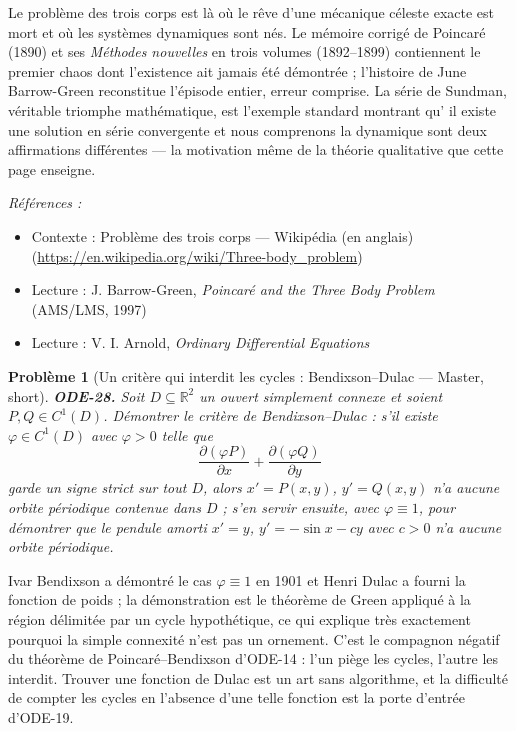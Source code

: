 \documentclass[11pt]{article}
\newtheorem{problem}{Problème}
\newenvironment{refs}{\par\small\noindent\emph{Références :}\begin{itemize}\setlength\itemsep{0pt}}{\end{itemize}\normalsize}
\begin{document}
\noindent Le problème des trois corps est là où le rêve d'une mécanique céleste exacte est
mort et où les systèmes dynamiques sont nés. Le mémoire corrigé de Poincaré (1890) et ses
\textit{Méthodes nouvelles} en trois volumes (1892--1899) contiennent le premier chaos dont
l'existence ait jamais été démontrée ; l'histoire de June Barrow-Green reconstitue l'épisode
entier, erreur comprise. La série de Sundman, véritable triomphe mathématique, est l'exemple
standard montrant qu'\og{} il existe une solution en série convergente \fg{} et \og{} nous comprenons la
dynamique \fg{} sont deux affirmations différentes --- la motivation même de la théorie qualitative que
cette page enseigne.

\begin{refs}
\item Contexte : Problème des trois corps --- Wikipédia (en anglais) (\url{https://en.wikipedia.org/wiki/Three-body_problem})
\item Lecture : J. Barrow-Green, \textit{Poincaré and the Three Body Problem} (AMS/LMS, 1997)
\item Lecture : V. I. Arnold, \textit{Ordinary Differential Equations}
\end{refs}

\bigskip

\begin{problem}[{Un critère qui interdit les cycles : Bendixson--Dulac --- Master, short}]
\textbf{ODE-28.} Soit $ D \subseteq \mathbb{R}^2 $ un ouvert simplement
connexe et soient $ P, Q \in C^1(D) $. Démontrer le critère de Bendixson--Dulac : s'il existe
$ \varphi \in C^1(D) $ avec $ \varphi >0 $ telle que
\[ \frac{\partial(\varphi P)}{\partial x} + \frac{\partial(\varphi Q)}{\partial y} \]
garde un signe strict sur tout $ D $, alors $ x' = P(x,y) $, $ y' = Q(x,y) $ n'a aucune
orbite périodique contenue dans $ D $ ; s'en servir ensuite, avec $ \varphi \equiv 1 $, pour
démontrer que le pendule amorti $ x' = y $, $ y' = -\sin x - cy $ avec $ c >0 $ n'a
aucune orbite périodique.
\end{problem}

\noindent Ivar Bendixson a démontré le cas $ \varphi \equiv 1 $ en 1901 et Henri Dulac
a fourni la fonction de poids ; la démonstration est le théorème de Green appliqué à la région
délimitée par un cycle hypothétique, ce qui explique très exactement pourquoi la simple connexité
n'est pas un ornement. C'est le compagnon négatif du théorème de Poincaré--Bendixson d'ODE-14 :
l'un piège les cycles, l'autre les interdit. Trouver une fonction de Dulac est un art sans
algorithme, et la difficulté de compter les cycles en l'absence d'une telle fonction est la porte
d'entrée d'ODE-19.
\end{document}
